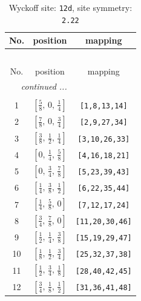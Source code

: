 \documentclass[fleqn,8pt]{jsarticle}
\begin{document}
\begin{longtable}{ccc}
\caption{Wyckoff site: {\tt 12d}, site symmetry: {\tt 2.22}}
 \\
 \hline \hline
No. & position & mapping \\ \hline \endfirsthead

\multicolumn{2}{l}{\tablename\ \thetable{}} \\
 \hline \hline
No. & position & mapping \\ \hline \endhead

 \hline \hline
\multicolumn{2}{r}{\footnotesize\it continued ...} \\ \endfoot

 \hline \hline
\multicolumn{2}{r}{} \\ \endlastfoot

1 & $\left[ \frac{5}{8},\, 0,\, \frac{1}{4} \right]$ & {\tt [1,8,13,14]} \\ \hline
2 & $\left[ \frac{7}{8},\, 0,\, \frac{3}{4} \right]$ & {\tt [2,9,27,34]} \\ \hline
3 & $\left[ \frac{3}{8},\, \frac{1}{2},\, \frac{1}{4} \right]$ & {\tt [3,10,26,33]} \\ \hline
4 & $\left[ 0,\, \frac{1}{4},\, \frac{5}{8} \right]$ & {\tt [4,16,18,21]} \\ \hline
5 & $\left[ 0,\, \frac{3}{4},\, \frac{7}{8} \right]$ & {\tt [5,23,39,43]} \\ \hline
6 & $\left[ \frac{1}{4},\, \frac{3}{8},\, \frac{1}{2} \right]$ & {\tt [6,22,35,44]} \\ \hline
7 & $\left[ \frac{1}{4},\, \frac{5}{8},\, 0 \right]$ & {\tt [7,12,17,24]} \\ \hline
8 & $\left[ \frac{3}{4},\, \frac{7}{8},\, 0 \right]$ & {\tt [11,20,30,46]} \\ \hline
9 & $\left[ \frac{1}{2},\, \frac{1}{4},\, \frac{3}{8} \right]$ & {\tt [15,19,29,47]} \\ \hline
10 & $\left[ \frac{1}{8},\, \frac{1}{2},\, \frac{3}{4} \right]$ & {\tt [25,32,37,38]} \\ \hline
11 & $\left[ \frac{1}{2},\, \frac{3}{4},\, \frac{1}{8} \right]$ & {\tt [28,40,42,45]} \\ \hline
12 & $\left[ \frac{3}{4},\, \frac{1}{8},\, \frac{1}{2} \right]$ & {\tt [31,36,41,48]} \\
\end{longtable}
\renewcommand{\arraystretch}{1.2}
\end{document}
